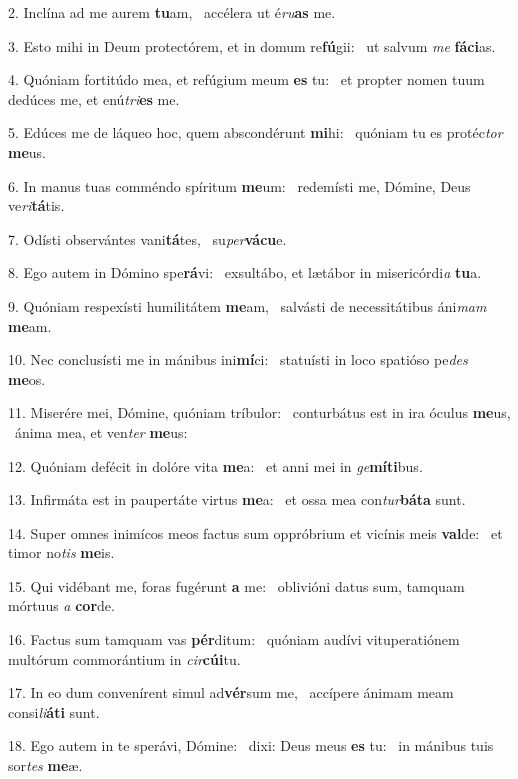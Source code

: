 2. Inclína ad me aurem \textbf{tu}am, \ast\  accélera ut é\textit{ru}\textbf{as} me.\

3. Esto mihi in Deum protectórem, et in domum re\textbf{fú}gii: \ast\  ut salvum \textit{me} \textbf{fá}\textbf{ci}as.\

4. Quóniam fortitúdo mea, et refúgium meum \textbf{es} tu: \ast\  et propter nomen tuum dedúces me, et enú\textit{tri}\textbf{es} me.\

5. Edúces me de láqueo hoc, quem abscondérunt \textbf{mi}hi: \ast\  quóniam tu es protéc\textit{tor} \textbf{me}us.\

6. In manus tuas comméndo spíritum \textbf{me}um: \ast\  redemísti me, Dómine, Deus ve\textit{ri}\textbf{tá}tis.\

7. Odísti observántes vani\textbf{tá}tes, \ast\  su\textit{per}\textbf{vá}\textbf{cu}e.\

8. Ego autem in Dómino spe\textbf{rá}vi: \ast\  exsultábo, et lætábor in misericórdi\textit{a} \textbf{tu}a.\

9. Quóniam respexísti humilitátem \textbf{me}am, \ast\  salvásti de necessitátibus áni\textit{mam} \textbf{me}am.\

10. Nec conclusísti me in mánibus ini\textbf{mí}ci: \ast\  statuísti in loco spatióso pe\textit{des} \textbf{me}os.\

11. Miserére mei, Dómine, quóniam tríbulor: \dag\  conturbátus est in ira óculus \textbf{me}us, \ast\  ánima mea, et ven\textit{ter} \textbf{me}us:\

12. Quóniam defécit in dolóre vita \textbf{me}a: \ast\  et anni mei in \textit{ge}\textbf{mí}\textbf{ti}bus.\

13. Infirmáta est in paupertáte virtus \textbf{me}a: \ast\  et ossa mea con\textit{tur}\textbf{bá}\textbf{ta} sunt.\

14. Super omnes inimícos meos factus sum oppróbrium et vicínis meis \textbf{val}de: \ast\  et timor no\textit{tis} \textbf{me}is.\

15. Qui vidébant me, foras fugérunt \textbf{a} me: \ast\  oblivióni datus sum, tamquam mórtuus \textit{a} \textbf{cor}de.\

16. Factus sum tamquam vas \textbf{pér}ditum: \ast\  quóniam audívi vituperatiónem multórum commorántium in \textit{cir}\textbf{cú}\textbf{i}tu.\

17. In eo dum convenírent simul ad\textbf{vér}sum me, \ast\  accípere ánimam meam consi\textit{li}\textbf{á}\textbf{ti} sunt.\

18. Ego autem in te sperávi, Dómine: \dag\  dixi: Deus meus \textbf{es} tu: \ast\  in mánibus tuis sor\textit{tes} \textbf{me}æ.\


